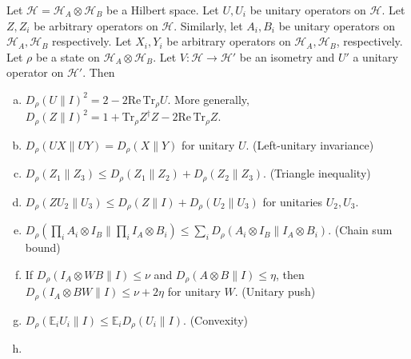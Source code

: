 \begin{lemma}\label{lemma:state-dependent-distance}
	Let $\mathcal{H} = \mathcal{H}_A\otimes \mathcal{H}_B$ be a Hilbert space. Let $U,U_i$ be unitary operators on $\mathcal{H}$. Let $Z,Z_i$ be arbitrary operators on $\mathcal{H}$. Similarly, let $A_i, B_i$ be unitary operators on $\mathcal{H}_A, \mathcal{H}_B$ respectively. Let $X_i, Y_i$ be arbitrary operators on $\mathcal{H}_A, \mathcal{H}_B$, respectively.
	Let $\rho$ be a state on $\mathcal{H}_A\otimes \mathcal{H}_B$. Let $V: \mathcal{H}\to \mathcal{H}'$ be an isometry and $U'$ a unitary operator on $\mathcal{H}'$. Then
	\begin{enumerate}[(a)]
		\item
		\label{item:state-dependent-distance-square}
		$D_\rho(U \| I)^2 =2 - 2\mathrm{Re}\,\mathrm{Tr}_\rho U$. More generally, $D_\rho(Z \| I)^2 = 1 + \mathrm{Tr}_\rho Z^\dagger Z - 2\mathrm{Re}\,\mathrm{Tr}_\rho Z$.
		\item
		\label{item:state-dependent-distance-inverse}
		$D_\rho(UX \| UY) = D_\rho(X \| Y)$ for unitary $U$. (Left-unitary invariance)
		\item\label{item:state-dependent-distance-triangle}
		$D_\rho(Z_1 \| Z_3) \leq D_\rho(Z_1 \| Z_2) + D_\rho(Z_2 \| Z_3)$. (Triangle inequality)
		\item\label{item:state-dependent-distance-right-multiplication}
		$D_\rho(ZU_2 \| U_3) \leq D_\rho(Z \| I) + D_\rho(U_2 \| U_3)$ for unitaries $U_2, U_3$.
		\item\label{item:state-dependent-distance-chaining}
		$D_\rho(\prod_{i}A_i\otimes I_B \| \prod_{i}I_A \otimes B_i) \leq \sum_i D_\rho(A_i\otimes I_B \| I_A\otimes B_i)$. (Chain sum bound)
		\item\label{item:state-dependent-distance-conjugation}
		If $D_\rho(I_A\otimes WB \| I) \leq \nu$ and $D_\rho(A\otimes B \| I)\leq \eta$, then $D_\rho(I_A\otimes BW \| I)\leq \nu + 2\eta$ for unitary $W$. (Unitary push)
		\item\label{item:state-dependent-distance-jensen}
		$D_\rho(\mathbb{E}_i U_i \| I) \leq \mathbb{E}_i D_\rho(U_i \| I)$. (Convexity)
		\item \label{item:state-dependent-distance-partial-trace}

\end{enumerate}
\end{lemma}
